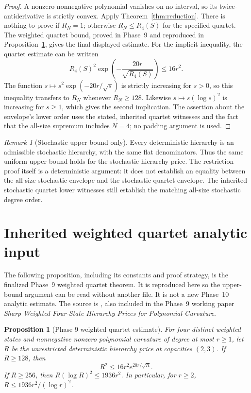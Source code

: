 \documentclass[11pt]{article}
\newtheorem{proposition}[theorem]{Proposition}
\theoremstyle{remark}\newtheorem{remark}[theorem]{Remark}
\begin{document}
\begin{proof}
A nonzero nonnegative polynomial vanishes on no interval, so its
twice-antiderivative is strictly convex. Apply
Theorem~\ref{thm:reduction}. There is nothing to prove if $R_N=1$;
otherwise $R_N\le R_4(S)$ for the specified quartet. The weighted quartet
bound, proved in Phase~9 and reproduced in
Proposition~\ref{prop:inherited}, gives the final displayed estimate.
For the implicit inequality, the quartet estimate can be written
\[
 R_4(S)^2\exp\left(-\frac{20r}{\sqrt{R_4(S)}}\right)\le16r^2.
\]
The function $s\mapsto s^2\exp(-20r/\sqrt{s})$ is strictly increasing
for $s>0$, so this inequality transfers to $R_N$ whenever $R_N\ge128$.
Likewise $s\mapsto s(\log s)^2$ is increasing for $s\ge1$, which gives
the second implication. The assertion about the envelope's lower order
uses the stated, inherited quartet witnesses and the fact that the
all-size supremum includes $N=4$; no padding argument is used.
\end{proof}

\begin{remark}[Stochastic upper bound only]
Every deterministic hierarchy is an admissible stochastic hierarchy,
with the same flat denominators. Thus the same uniform upper bound
holds for the stochastic hierarchy price. The restriction proof itself
is a deterministic argument: it does not establish an equality between
the all-size stochastic envelope and the stochastic quartet envelope.
The inherited stochastic quartet lower witnesses still establish the
matching all-size stochastic degree order.
\end{remark}

\section{Inherited weighted quartet analytic input}

The following proposition, including its constants and proof strategy,
is the finalized Phase~9 weighted quartet theorem. It is reproduced here
so the upper-bound argument can be read without another file. It is not
a new Phase~10 analytic estimate. The source is
,
also included in the Phase~9
working paper \emph{Sharp Weighted Four-State Hierarchy Prices for
Polynomial Curvature}.

\begin{proposition}[Phase 9 weighted quartet estimate]
\label{prop:inherited}
For four distinct weighted states and nonnegative nonzero polynomial
curvature of degree at most $r\ge1$, let $R$ be the unrestricted
deterministic hierarchy price at capacities $(2,3)$. If $R\ge128$, then
\[
 R^2\le16r^2e^{20r/\sqrt R}.
\]
If $R\ge256$, then $R(\log R)^2\le1936r^2$. In particular, for $r\ge2$,
$R\le1936r^2/(\log r)^2$.
\end{proposition}
\end{document}
